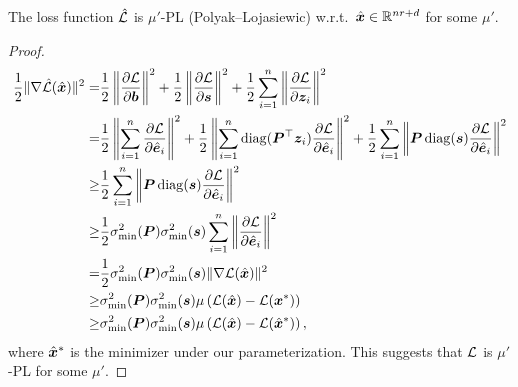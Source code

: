 \begin{lemma}\label{lem:pl}
    The loss function $\hat {{\mathcal{L}}}$ is  $\mu'$-PL (Polyak--Lojasiewic) w.r.t.~$\hat{{\bm{x}}} \in {{\mathbb{R}}^{nr+d}}$ for some $\mu'$.
\end{lemma}
\begin{proof}
\begin{align}
     \frac{1}{2} \| \nabla \hat{{\mathcal{L}}}(\hat {{\bm{x}}}) \|^2
     =& \frac{1}{2}  \left\| \frac{\partial {\mathcal{L}}}{\partial {\bm{b}}} \right\|^2 + \frac{1}{2}  \left\| \frac{\partial {\mathcal{L}}}{\partial {\bm{s}}} \right\|^2  + \frac{1}{2}  \sum_{i=1}^n \left\|\frac{\partial {\mathcal{L}}}{\partial {\bm{z}}_i} \right\|^2 \\
     =& \frac{1}{2}  \left\| \sum_{i=1}^n \frac{\partial {\mathcal{L}}}{\partial \hat {{\bm{e}}}_i} \right\|^2 + \frac{1}{2}  \left\| \sum_{i=1}^n \operatorname{diag}( {\bm{P}}^\top {\bm{z}}_i) \frac{\partial {\mathcal{L}}}{\partial \hat {{\bm{e}}}_i} \right\|^2 + \frac{1}{2}  \sum_{i=1}^n \left\| {\bm{P}} \operatorname{diag}({\bm{s}}) \frac{\partial {\mathcal{L}}}{\partial \hat {{\bm{e}}}_i} \right\|^2 \\
     \ge& \frac{1}{2}  \sum_{i=1}^n \left\| {\bm{P}} \operatorname{diag}({\bm{s}}) \frac{\partial {\mathcal{L}}}{\partial \hat {{\bm{e}}}_i} \right\|^2 \\
    \ge& \frac{1}{2}  \sigma_{\min}^2({\bm{P}})\sigma_{\min}^2({\bm{s}}) \sum_{i=1}^n \left\| \frac{\partial {\mathcal{L}}}{\partial \hat {{\bm{e}}}_i} \right\|^2 \\
    =& \frac{1}{2}  \sigma_{\min}^2({\bm{P}})\sigma_{\min}^2({\bm{s}}) \| \nabla {\mathcal{L}}(\hat{{\bm{x}}}) \|^2 \\
    \ge& \sigma_{\min}^2({\bm{P}})\sigma_{\min}^2({\bm{s}})\mu\left( {\mathcal{L}}(\hat{{\bm{x}}}) - {\mathcal{L}}({\bm{x}}^*)\right) \\
    \ge& \sigma_{\min}^2({\bm{P}})\sigma_{\min}^2({\bm{s}})\mu\left( {\mathcal{L}}(\hat{{\bm{x}}}) - {\mathcal{L}}(\hat{{\bm{x}}}^*)\right),
\end{align}
where $\hat {{\bm{x}}}^*$ is the minimizer under our parameterization. This suggests that ${\mathcal{L}}$ is $\mu'$-PL for some $\mu'$.
\end{proof}


